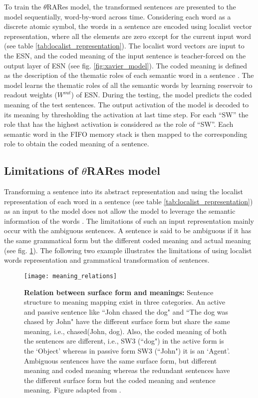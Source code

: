 To train the $\theta$RARes model, the transformed sentences are presented to the model sequentially, word-by-word across time. Considering each word as a discrete atomic symbol, the words in a sentence are encoded using localist vector representation, where all the elements are zero except for the current input word (see table \ref{tab:localist_representation}). The localist word vectors are input to the ESN, and the coded meaning of the input sentence is teacher-forced on the output layer of ESN (see fig. \ref{fig:xavier_model}). The coded meaning is defined as the description of the thematic roles of each semantic word in a sentence \cite{xavier:2013:RT}. The model learns the thematic roles of all the semantic words by learning reservoir to readout weights ($W^{out}$) of ESN. During the testing, the model predicts the coded meaning of the test sentences. The output activation of the model is decoded to its meaning by thresholding the activation at last time step. For each ``SW'' the role that has the highest activation is considered as the role of ``SW''. Each semantic word in the FIFO memory stack is then mapped to the corresponding role to obtain the coded meaning of a sentence.

\subsection{Limitations of $\theta$RARes model }

Transforming a sentence into its abstract representation and using the localist representation of each word in a sentence (see table \ref{tab:localist_representation}) as an input to the model does not allow the model to leverage the semantic information of the words \cite{w2v:tensor_flow}. The limitations of such an input representation mainly occur with the ambiguous sentences. A sentence is said to be ambiguous if it has the same grammatical form but the different coded meaning and actual meaning (see fig. \ref{fig:meaning_realtions}). The following two example illustrates the limitations of using localist words representation and grammatical transformation of sentences.

\begin{figure}[hbtp]
\centering
\texttt{[image: meaning\_relations]}
\caption[Relation between sentence surface form and meanings.] {\textbf{Relation between surface form and meanings: } {\small Sentence structure to meaning mapping exist in three categories. An active and passive sentence like ``John chased the dog" and ``The dog was chased by John" have the different surface form but share the same meaning, i.e., chased(John, dog). Also, the coded meaning of both the sentences are different, i.e., SW3 (``dog") in the active form is the `Object' whereas in passive form SW3 (``John") it is an `Agent'. Ambiguous sentences have the same surface form, but different meaning and coded meaning whereas the redundant sentences have the different surface form but the coded meaning and sentence meaning. Figure adapted from \cite{xavier:2013:RT}.}}
\label{fig:meaning_realtions}
\end{figure}

